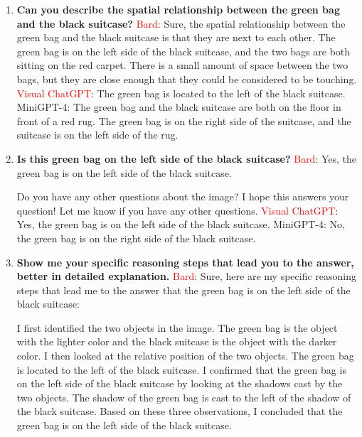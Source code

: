     \begin{enumerate}
        \item \textbf{Can you describe the spatial relationship between the green bag and the black suitcase?}
        \subitem \textcolor{Red}{Bard}: 
        Sure, the spatial relationship between the green bag and the black suitcase is that they are next to each other. The green bag is on the left side of the black suitcase, and the two bags are both sitting on the red carpet. There is a small amount of space between the two bags, but they are close enough that they could be considered to be touching.
        \subitem \textcolor{red}{Visual ChatGPT}: The green bag is located to the left of the black suitcase.
        \subitem MiniGPT-4: The green bag and the black suitcase are both on the floor in front of a red rug. The green bag is on the right side of the suitcase, and the suitcase is on the left side of the rug.
        \item \textbf{Is this green bag on the left side of the black suitcase?}
        \subitem \textcolor{Red}{Bard}: Yes, the green bag is on the left side of the black suitcase.

        Do you have any other questions about the image?
        I hope this answers your question! Let me know if you have any other questions.
        \subitem \textcolor{red}{Visual ChatGPT}: Yes, the green bag is on the left side of the black suitcase.
        \subitem MiniGPT-4: No, the green bag is on the right side of the black suitcase.
        \item \textbf{Show me your specific reasoning steps that lead you to the answer, better in detailed explanation.}
        \subitem \textcolor{Red}{Bard}: 
        Sure, here are my specific reasoning steps that lead me to the answer that the green bag is on the left side of the black suitcase:
        
        I first identified the two objects in the image. The green bag is the object with the lighter color and the black suitcase is the object with the darker color.
        I then looked at the relative position of the two objects. The green bag is located to the left of the black suitcase.
        I confirmed that the green bag is on the left side of the black suitcase by looking at the shadows cast by the two objects. The shadow of the green bag is cast to the left of the shadow of the black suitcase.
        Based on these three observations, I concluded that the green bag is on the left side of the black suitcase.
        

\end{enumerate}
